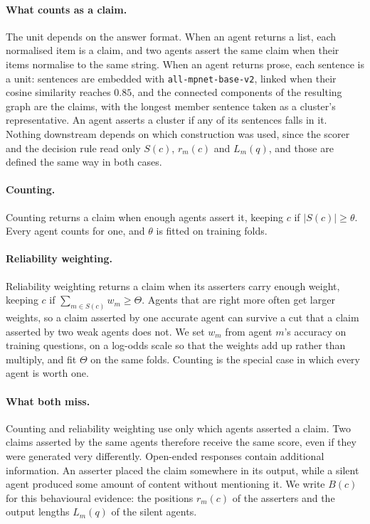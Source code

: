 \documentclass{article}
\begin{document}
\paragraph{What counts as a claim.}
The unit depends on the answer format. When an agent returns a list, each normalised item
is a claim, and two agents assert the same claim when their items normalise to the same
string. When an agent returns prose, each sentence is a unit: sentences are embedded with
\texttt{all-mpnet-base-v2}, linked when their cosine similarity reaches $0.85$, and the
connected components of the resulting graph are the claims, with the longest member
sentence taken as a cluster's representative. An agent asserts a cluster if any of its
sentences falls in it. Nothing downstream depends on which construction was used, since
the scorer and the decision rule read only $S(c)$, $r_m(c)$ and $L_m(q)$, and those are
defined the same way in both cases.

\paragraph{Counting.}
Counting returns a claim when enough agents assert it, keeping $c$ if
$|S(c)| \geq \theta$. Every agent counts for one, and $\theta$ is fitted on training
folds.

\paragraph{Reliability weighting.}
Reliability weighting returns a claim when its asserters carry enough weight, keeping
$c$ if $\sum_{m \in S(c)} w_m \geq \Theta$. Agents that are right more often get larger
weights, so a claim asserted by one accurate agent can survive a cut that a claim
asserted by two weak agents does not. We set $w_m$ from agent $m$'s accuracy on training
questions, on a log-odds scale so that the weights add up rather than multiply, and fit
$\Theta$ on the same folds. Counting is the special case in which every agent is
worth one.

\paragraph{What both miss.}
Counting and reliability weighting use only which agents asserted a claim. Two claims
asserted by the same agents therefore receive the same score, even if they were generated
very differently. Open-ended responses contain additional information. An asserter placed
the claim somewhere in its output, while a silent agent produced some amount of content
without mentioning it. We write $B(c)$ for this behavioural evidence: the positions
$r_m(c)$ of the asserters and the output lengths $L_m(q)$ of the silent agents.
\end{document}
